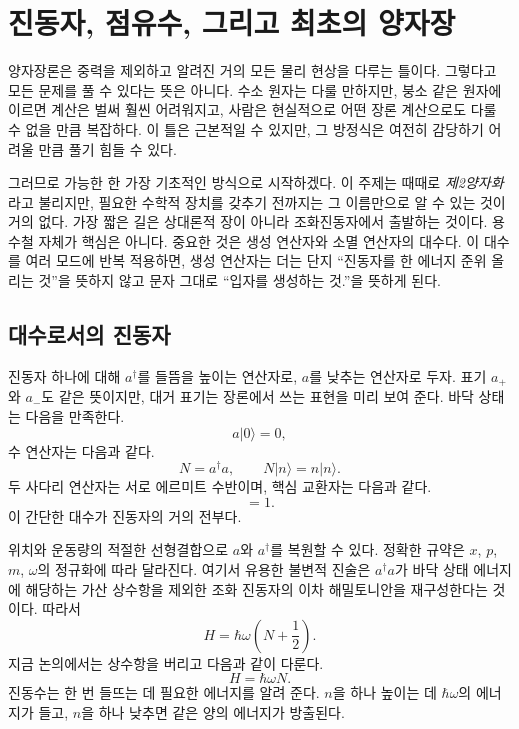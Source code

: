 \chapter{진동자, 점유수, 그리고 최초의 양자장}

양자장론은 중력을 제외하고 알려진 거의 모든 물리 현상을 다루는 틀이다. 그렇다고 모든 문제를 풀 수 있다는 뜻은 아니다. 수소 원자는 다룰 만하지만, 붕소 같은 원자에 이르면 계산은 벌써 훨씬 어려워지고, 사람은 현실적으로 어떤 장론 계산으로도 다룰 수 없을 만큼 복잡하다. 이 틀은 근본적일 수 있지만, 그 방정식은 여전히 감당하기 어려울 만큼 풀기 힘들 수 있다.

그러므로 가능한 한 가장 기초적인 방식으로 시작하겠다. 이 주제는 때때로 \emph{제2양자화}라고 불리지만, 필요한 수학적 장치를 갖추기 전까지는 그 이름만으로 알 수 있는 것이 거의 없다. 가장 짧은 길은 상대론적 장이 아니라 조화진동자에서 출발하는 것이다. 용수철 자체가 핵심은 아니다. 중요한 것은 생성 연산자와 소멸 연산자의 대수다. 이 대수를 여러 모드에 반복 적용하면, 생성 연산자는 더는 단지 ``진동자를 한 에너지 준위 올리는 것''을 뜻하지 않고 문자 그대로 ``입자를 생성하는 것.''을 뜻하게 된다.

\section{대수로서의 진동자}

진동자 하나에 대해 \(a^\dagger\)를 들뜸을 높이는 연산자로, \(a\)를 낮추는 연산자로 두자. 표기 \(a_+\)와 \(a_-\)도 같은 뜻이지만, 대거 표기는 장론에서 쓰는 표현을 미리 보여 준다. 바닥 상태는 다음을 만족한다.
\begin{equation}
a|0\rangle=0,
\end{equation}
수 연산자는 다음과 같다.
\begin{equation}
N=a^\dagger a,
\qquad
N|n\rangle=n|n\rangle.
\end{equation}
두 사다리 연산자는 서로 에르미트 수반이며, 핵심 교환자는 다음과 같다.
\begin{equation}
[a,a^\dagger]=1.
\label{eq:l06-single-commutator}
\end{equation}
이 간단한 대수가 진동자의 거의 전부다.

위치와 운동량의 적절한 선형결합으로 \(a\)와 \(a^\dagger\)를 복원할 수 있다. 정확한 규약은 \(x\), \(p\), \(m\), \(\omega\)의 정규화에 따라 달라진다. 여기서 유용한 불변적 진술은 \(a^\dagger a\)가 바닥 상태 에너지에 해당하는 가산 상수항을 제외한 조화 진동자의 이차 해밀토니안을 재구성한다는 것이다. 따라서
\begin{equation}
H=\hbar\omega\left(N+\frac12\right).
\end{equation}
지금 논의에서는 상수항을 버리고 다음과 같이 다룬다.
\begin{equation}
H=\hbar\omega N.
\label{eq:l06-one-oscillator-hamiltonian}
\end{equation}
진동수는 한 번 들뜨는 데 필요한 에너지를 알려 준다. \(n\)을 하나 높이는 데 \(\hbar\omega\)의 에너지가 들고, \(n\)을 하나 낮추면 같은 양의 에너지가 방출된다.

